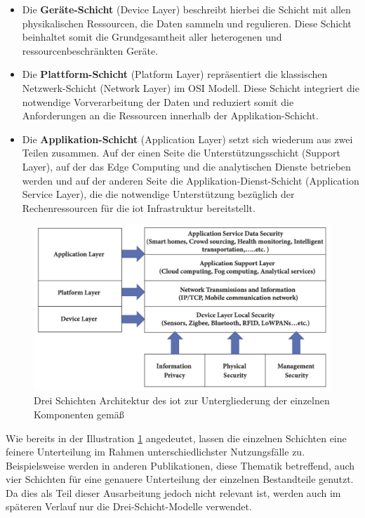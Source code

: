 \begin{itemize}
    \item Die \textbf{Geräte-Schicht} (Device Layer) beschreibt hierbei die Schicht mit allen physikalischen Ressourcen, die Daten sammeln und regulieren. Diese Schicht beinhaltet somit die Grundgesamtheit aller heterogenen und ressourcenbeschränkten Geräte.
    \item Die \textbf{Plattform-Schicht} (Platform Layer) repräsentiert die klassischen Netzwerk-Schicht (Network Layer) im OSI Modell. Diese Schicht integriert die notwendige Vorverarbeitung der Daten und reduziert somit die Anforderungen an die Ressourcen innerhalb der Applikation-Schicht.
    \item Die \textbf{Applikation-Schicht} (Application Layer) setzt sich wiederum aus zwei Teilen zusammen. Auf der einen Seite die Unterstützungsschicht (Support Layer), auf der das Edge Computing und die analytischen Dienste betrieben werden und auf der anderen Seite die Applikation-Dienst-Schicht (Application Service Layer), die die notwendige Unterstützung bezüglich der Rechenressourcen für die \ac{iot} Infrastruktur bereitstellt.
\end{itemize}

\begin{figure}
    \includegraphics[width=\textwidth]{fundamentals/pictures/IoT_Layer_Architecture}
    \caption{Drei Schichten Architektur des \ac{iot} zur Untergliederung der einzelnen Komponenten gemäß \cite{Seliem2018}}
    \label{fig:drei-schichten-iot}
\end{figure}

\noindent Wie bereits in der Illustration \ref{fig:drei-schichten-iot} angedeutet, lassen die einzelnen Schichten eine feinere Unterteilung im Rahmen unterschiedlichster Nutzungsfälle zu. Beispielsweise werden in anderen Publikationen, diese Thematik betreffend, auch vier Schichten für eine genauere Unterteilung der einzelnen Bestandteile genutzt. Da dies als Teil dieser Ausarbeitung jedoch nicht relevant ist, werden auch im späteren Verlauf nur die Drei-Schicht-Modelle verwendet.

